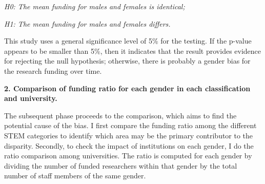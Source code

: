 \begin{center}
    \textit{H0: The mean funding for males and females is identical;}
\end{center}
\begin{center}
    \textit{H1: The mean funding for males and females differs.}
\end{center}

This study uses a general significance level of 5\% for the testing. If the p-value appears to be smaller than 5\%, then it indicates that the result provides evidence for rejecting the null hypothesis; otherwise, there is probably a gender bias for the research funding over time.

\textbf{2. Comparison of funding ratio for each gender in each classification and university.}

The subsequent phase proceeds to the comparison, which aims to find the potential cause of the bias. I first compare the funding ratio among the different STEM categories to identify which area may be the primary contributor to the disparity. Secondly, to check the impact of institutions on each gender, I do the ratio comparison among universities. The ratio is computed for each gender by dividing the number of funded researchers within that gender by the total number of staff members of the same gender. 



